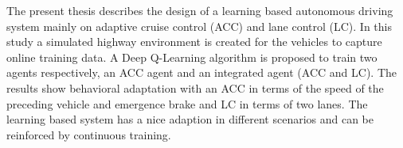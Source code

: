 \begin{sloppypar}

The present thesis describes the design of a learning based autonomous driving system mainly on adaptive cruise control (ACC) and lane control (LC). In this study a simulated highway environment is created for the vehicles to capture online training data. A Deep Q-Learning algorithm is proposed to train two agents respectively, an ACC agent and an integrated agent (ACC and LC). The results show behavioral adaptation with an ACC in terms of the speed of the preceding vehicle and emergence brake and LC in terms of two lanes. The learning based system has a nice adaption in different scenarios and can be reinforced by continuous training.

\newpage
\end{sloppypar}
%
%
